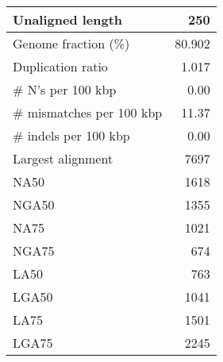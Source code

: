 \documentclass[12pt,a4paper]{article}
\begin{document}
\begin{table}[ht]
\begin{center}
\begin{tabular}{|l*{1}{|r}|}
Unaligned length & 250 \\ \hline
Genome fraction (\%) & 80.902 \\ \hline
Duplication ratio & 1.017 \\ \hline
\# N's per 100 kbp & 0.00 \\ \hline
\# mismatches per 100 kbp & 11.37 \\ \hline
\# indels per 100 kbp & 0.00 \\ \hline
Largest alignment & 7697 \\ \hline
NA50 & 1618 \\ \hline
NGA50 & 1355 \\ \hline
NA75 & 1021 \\ \hline
NGA75 & 674 \\ \hline
LA50 & 763 \\ \hline
LGA50 & 1041 \\ \hline
LA75 & 1501 \\ \hline
LGA75 & 2245 \\ \hline
\end{tabular}
\end{center}
\end{table}
\end{document}
